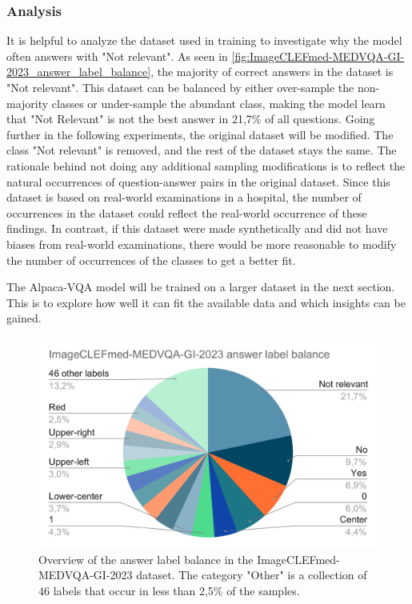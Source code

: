     \subsubsection{Analysis}
    
    It is helpful to analyze the dataset used in training to investigate why the model often answers with "Not relevant".
    As seen in \autoref{fig:ImageCLEFmed-MEDVQA-GI-2023_answer_label_balance}, the majority of correct answers in the dataset is "Not relevant". This dataset can be balanced by either over-sample the non-majority classes or under-sample the abundant class, making the model learn that "Not Relevant" is not the best answer in 21,7\% of all questions.
    Going further in the following experiments, the original dataset will be modified. The class "Not relevant" is removed, and the rest of the dataset stays the same. The rationale behind not doing any additional sampling modifications is to reflect the natural occurrences of question-answer pairs in the original dataset. Since this dataset is based on real-world examinations in a hospital, the number of occurrences in the dataset could reflect the real-world occurrence of these findings. In contrast, if this dataset were made synthetically and did not have biases from real-world examinations, there would be more reasonable to modify the number of occurrences of the classes to get a better fit. 
    
    The Alpaca-VQA model will be trained on a larger dataset in the next section. 
    This is to explore how well it can fit the available data and which insights can be gained.


    \begin{figure}[htb]
        \centerline{
        \includegraphics[width=1.08\textwidth]{images/ImageCLEFmed-MEDVQA-GI-2023_answer_label_balance}}
        \caption{Overview of the answer label balance in the ImageCLEFmed-MEDVQA-GI-2023 dataset. 
        The category "Other" is a collection of 46 labels that occur in less than 2,5\% of the samples.}
        \label{fig:ImageCLEFmed-MEDVQA-GI-2023_answer_label_balance}
    \end{figure} 



